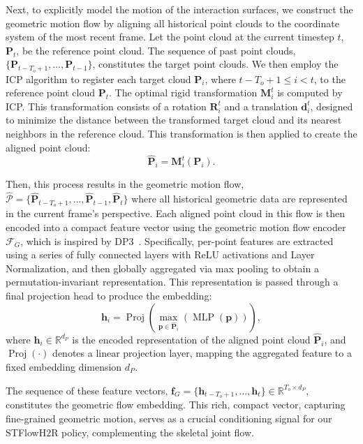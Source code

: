 \documentclass[final,5p,times,twocolumn]{elsarticle}
\begin{document}
Next, to explicitly model the motion of the interaction surfaces, we construct the geometric motion flow by aligning all historical point clouds to the coordinate system of the most recent frame. Let the point cloud at the current timestep $t$, $\mathbf{P}_t$, be the reference point cloud. The sequence of past point clouds, $\{ \mathbf{P}_{t-T_o+1}, \dots, \mathbf{P}_{t-1} \}$, constitutes the target point clouds. We then employ the ICP algorithm to register each target cloud $\mathbf{P}_i$, where $t- T_o + 1 \leq i < t$, to the reference point cloud $\mathbf{P}_t$. The optimal rigid transformation $\mathbf{M}_i^t$ is computed by ICP. This transformation consists of a rotation $\mathbf{R}_i^t$ and a translation $\mathbf{d}_i^t$, designed to minimize the distance between the transformed target cloud and its nearest neighbors in the reference cloud. This transformation is then applied to create the aligned point cloud:
\begin{equation}
\hat{\mathbf{P}}_i = \mathbf{M}_i^t (\mathbf{P}_i).
\end{equation}

Then, this process results in the geometric motion flow,  $ \hat{\mathcal{P}} = \{ \mathbf{\hat{P}}_{t-T_o+1}, \dots, \mathbf{\hat{P}}_{t-1}, \mathbf{\hat{P}}_{t} \}$ where all historical geometric data are represented in the current frame's perspective. Each aligned point cloud in this flow is then encoded into a compact feature vector using the geometric motion flow encoder $\mathcal{F}_G$, which is inspired by DP3~\cite{Ze2024DP3}. Specifically, per-point features are extracted using a series of fully connected layers with ReLU activations and Layer Normalization, and then globally aggregated via max pooling to obtain a permutation-invariant representation. This representation is passed through a final projection head to produce the embedding:
\begin{equation}
\mathbf{h}_i=\operatorname{Proj}\left(\max_{\mathbf{p}\in\mathbf{\hat{P}}_i}\left(\operatorname{MLP}(\mathbf{p})\right)\right),
\end{equation}
where $\mathbf{h}_i \in \mathbb{R}^{d_P}$ is the encoded representation of the aligned point cloud $\hat{\mathbf{P}}_i$, and $\operatorname{Proj} (\cdot)$ denotes a linear projection layer, mapping the aggregated feature to a fixed embedding dimension $d_P$.

The sequence of these feature vectors, $\bm{f}_G = \{ \mathbf{h}_{t-T_o+1}, \dots, \mathbf{h}_t \} \in \mathbb{R}^{T_o \times d_P}$, constitutes the geometric flow embedding. This rich, compact vector, capturing fine-grained geometric motion, serves as a crucial conditioning signal for our STFlowH2R policy, complementing the skeletal joint flow.
\end{document}
